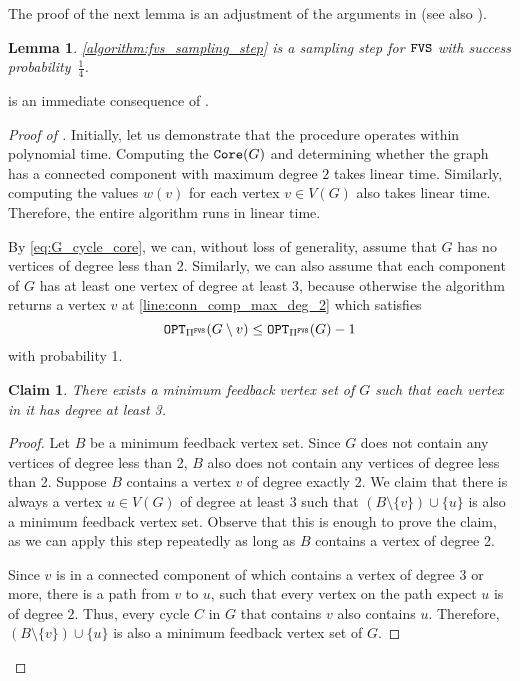 \documentclass[letterpaper,11pt]{article}
\newenvironment{claimproof}{\begin{proof}\renewcommand{\qedsymbol}{$\lrcorner$}}{\end{proof}}
\newcommand{\1}[1]{\mathds{1}\left[#1\right]}
\newcommand{\core}[1]{\textnormal{\texttt{Core}}(#1)}
\newcommand{\OPT}{\textnormal{\texttt{OPT}}}
\newtheorem{lemma}[theorem]{Lemma}
\newtheorem{claim}[theorem]{Claim}
\newcommand{\FVS}{\textnormal{\texttt{FVS}}\xspace}
\newcommand{\fvsPi}{\Pi^{\texttt{FVS}}}
\begin{document}
The proof of the next lemma is an adjustment of the arguments in \cite{beckerRandomizedAlgorithmsLoop2000} (see also \cite{cyganParameterizedAlgorithms2015a}). 
\begin{lemma}\label{lemma:fvs_proc}
	 \cref{algorithm:fvs_sampling_step} is a sampling step for $\FVS$ with success probability~$\frac{1}{4}$.
\end{lemma}
  is an immediate consequence of .
\begin{proof}[Proof of ]
	Initially, let us demonstrate that the procedure operates within
	polynomial time. Computing the $\core{G}$ and determining whether the
	graph has a connected component with maximum degree $2$ takes linear time.
	Similarly, computing the values
	$w(v)$ for each vertex $v \in V(G)$ also takes linear time. Therefore,
	the entire algorithm runs in linear time.

	By \eqref{eq:G_cycle_core}, we can, without loss of generality,
	assume that $G$ has no vertices of degree less than 2.
	Similarly, we can also assume that each component of $G$ has at least one vertex of
	degree at least 3, because otherwise the algorithm returns a vertex $v$ at
	\cref{line:conn_comp_max_deg_2} which satisfies
	\begin{equation*}
		\OPT_{\fvsPi}(G \setminus v) \leq \OPT_{\fvsPi}(G) - 1
	\end{equation*}
	with probability 1. 

	\begin{claim}
		There exists a minimum feedback vertex set of $G$ such that each vertex in it
		has degree at least 3.
	\end{claim}

	\begin{claimproof}
		Let $B$ be a minimum feedback vertex set. Since $G$ does not contain
		any vertices of degree less than 2, $B$ also does not contain
		any vertices of degree less than 2. Suppose $B$ contains a
		vertex $v$ of degree exactly 2. We claim that there is always a
		vertex $u \in V(G)$ of degree at least 3 such that $\left( B
		\setminus \{v\} \right) \cup \{u\}$ is also a minimum feedback vertex
		set. Observe that this is enough to prove the claim, as we can
		apply this step repeatedly as long as $B$ contains a vertex of
		degree 2.

		Since $v$ is in a connected component of which contains a vertex of degree $3$ or more, there is a path from $v$ to $u$, such that every vertex on the path expect $u$ is of degree $2$. Thus, every cycle $C$ in $G$ that contains $v$ also contains $u$. Therefore, $\left( B \setminus \{v\} \right) \cup \{u\}$ is also a minimum 
		feedback vertex set of $G$. 
	\end{claimproof}


\end{proof}
\end{document}
